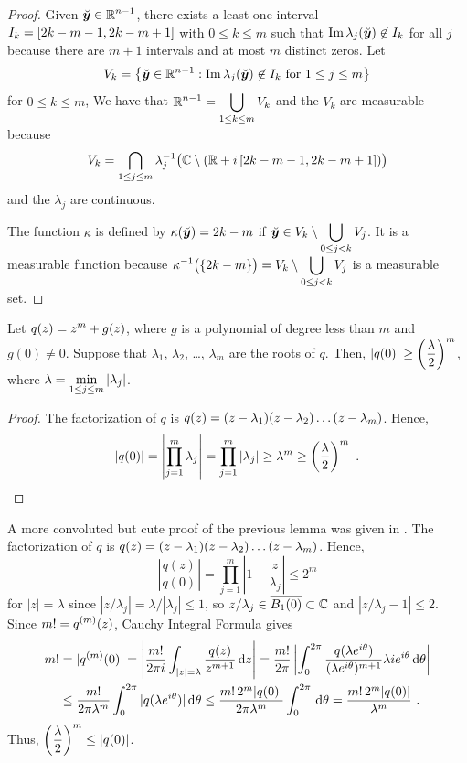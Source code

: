 \begin{proof}
Given $\displaystyle \breve{{\bm{y}}} \in \mathbb{R}^{n-1}$, there exists a
least one interval
$\displaystyle I_k = [2k-m-1, 2k-m+1]$ with $0\leq k \leq m$ such that
$\operatorname{Im} \lambda_j(\breve{{\bm{y}}}) \not\in I_k$ for all $j$ because there
are $m+1$ intervals and at most $m$ distinct zeros.  Let
\[
V_k = \left\{ \breve{{\bm{y}}} \in \mathbb{R}^{n-1} :
\operatorname{Im} \lambda_j(\breve{{\bm{y}}}) \not\in I_k \ \text{for} \ 1 \leq j
\leq m \right\}
\]
for $0 \leq k \leq m$,  We have that
$\displaystyle \mathbb{R}^{n-1} = \bigcup_{1\leq k \leq m} V_k$ and
the $V_k$ are measurable because
\[
V_k = \bigcap_{1\leq j \leq m} \lambda_j^{-1}\big(\mathbb{C} \setminus
(\mathbb{R} + i\,[2k-m-1,2k-m+1])\big)
\]
and the $\lambda_j$ are continuous.

The function $\kappa$ is defined by
$\displaystyle \kappa(\breve{{\bm{y}}}) = 2k-m$ if
$\displaystyle \breve{{\bm{y}}} \in V_k \setminus \bigcup_{0\leq j<k} V_j$.
It is a measurable function because
$\displaystyle \kappa^{-1}\big(\{2k-m\}\big)
= V_k \setminus \bigcup_{0\leq j<k} V_j$
is a measurable set.
\end{proof}

\begin{lemma} \label{distr_lPDE3_ex3}
Let $\displaystyle q(z) = z^m + g(z)$, where $g$ is a polynomial of
degree less than $m$ and $g(0) \neq 0$.  Suppose that $\lambda_1$,
$\lambda_2$, \ldots, $\lambda_m$ are the roots of $q$.  Then,
$\displaystyle \left| q(0)\right| \geq \left(\frac{\lambda}{2}\right)^m$,
where $\displaystyle \lambda = \min_{1\leq j\leq m} |\lambda_j|$.
\end{lemma}

\begin{proof}
The factorization of $q$ is
$\displaystyle q(z) = (z-\lambda_1)(z-\lambda_2)\ldots(z-\lambda_m)$.
Hence,
\[
\left| q(0) \right| = \left| \prod_{j=1}^m \lambda_j \right|
= \prod_{j=1}^m \left| \lambda_j \right| \geq
\lambda^m \geq \left(\frac{\lambda}{2}\right)^m \ .  \qedhere
\]
\end{proof}

\begin{rmk}
A more convoluted but cute proof of the previous lemma was given in
\cite{FoPDE}.  The factorization of $q$ is
$\displaystyle q(z) = (z-\lambda_1)(z-\lambda_2)\ldots(z-\lambda_m)$.
Hence,
\[
\left| \frac{q(z)}{q(0)} \right| = \prod_{j=1}^m
\left| 1 - \frac{z}{\lambda_j} \right| \leq 2^m
\]
for $|z|= \lambda$ since $|z/\lambda_j| = \lambda/|\lambda_j| \leq 1$,
so $z/\lambda_j \in \overline{B_1(0)} \subset \mathbb{C}$ and
$|z/\lambda_j - 1| \leq 2$.  Since $\displaystyle m! = q^{(m)}(z)$,
Cauchy Integral Formula gives
\begin{align*}
m! & = |q^{(m)}(0)| = \left| \frac{m!}{2\pi i}
\int_{|z|=\lambda} \frac{q(z)}{z^{m+1}} \,\mathrm{d}{z} \right|
= \frac{m!}{2\pi} \left| \int_0^{2\pi}
\frac{q(\lambda e^{i\theta})}{(\lambda e^{i\theta})^{m+1}}
\lambda i e^{i\theta} \,\mathrm{d}{\theta}\right| \\
& \leq \frac{m!}{2\pi \lambda^m} \int_0^{2\pi}
|q(\lambda e^{i\theta})| \,\mathrm{d}{\theta}
\leq \frac{m!\, 2^m |q(0)|}{2\pi \lambda^m} \int_0^{2\pi} \,\mathrm{d}{\theta}
= \frac{m!\, 2^m |q(0)|}{\lambda^m} \ .
\end{align*}
Thus, $\displaystyle \left(\frac{\lambda}{2}\right)^m \leq |q(0)|$.
\end{rmk}

